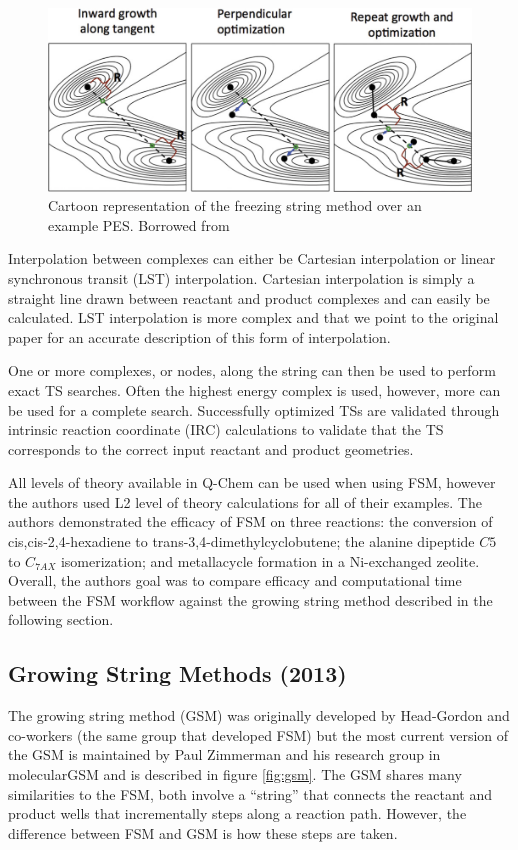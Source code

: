 \documentclass[preprint, 11pt]{elsarticle} %
\begin{document}
\begin{figure}
    \centering
    \includegraphics[width=5in]{fsm}
    \caption{Cartoon representation of the freezing string method over an example PES. Borrowed from \cite{}}
    \label{fig:fsm}
\end{figure}

Interpolation between complexes can either be Cartesian interpolation or linear synchronous transit (LST) interpolation. 
Cartesian interpolation is simply a straight line drawn between reactant and product complexes and can easily be calculated.
LST interpolation is more complex and that we point to the original paper for an accurate description of this form of interpolation. 

One or more complexes, or nodes, along the string can then be used to perform exact TS searches.
Often the highest energy complex is used, however, more can be used for a complete search. 
Successfully optimized TSs are validated through intrinsic reaction coordinate (IRC) calculations to validate that the TS corresponds to the correct input reactant and product geometries. 

All levels of theory available in Q-Chem \cite{} can be used when using FSM, however the authors used L2 level of theory calculations for all of their examples.
The authors demonstrated the efficacy of FSM on three reactions: the conversion of cis,cis-2,4-hexadiene to trans-3,4-dimethylcyclobutene; the alanine dipeptide $C5$ to $C_{7AX}$ isomerization; and metallacycle formation in a Ni-exchanged zeolite.
Overall, the authors goal was to compare efficacy and computational time between the FSM workflow against the growing string method described in the following section.

\subsection{Growing String Methods (2013)}

The growing string method (GSM) was originally developed by Head-Gordon and co-workers (the same group that developed FSM) but the most current version of the GSM is maintained by Paul Zimmerman and his research group in molecularGSM and is described in figure \ref{fig:gsm}.
The GSM shares many similarities to the FSM, both involve a ``string'' that connects the reactant and product wells that incrementally steps along a reaction path.
However, the difference between FSM and GSM is how these steps are taken. 
\end{document}
